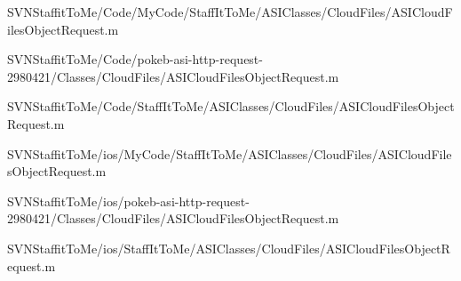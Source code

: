 \begin{DoxyCompactItemize}
\-S\-V\-N\-Staffit\-To\-Me/\-Code/\-My\-Code/\-Staff\-It\-To\-Me/\-A\-S\-I\-Classes/\-Cloud\-Files/\-A\-S\-I\-Cloud\-Files\-Object\-Request.\-m\item 
\-S\-V\-N\-Staffit\-To\-Me/\-Code/pokeb-\/asi-\/http-\/request-\/2980421/\-Classes/\-Cloud\-Files/\-A\-S\-I\-Cloud\-Files\-Object\-Request.\-m\item 
\-S\-V\-N\-Staffit\-To\-Me/\-Code/\-Staff\-It\-To\-Me/\-A\-S\-I\-Classes/\-Cloud\-Files/\-A\-S\-I\-Cloud\-Files\-Object\-Request.\-m\item 
\-S\-V\-N\-Staffit\-To\-Me/ios/\-My\-Code/\-Staff\-It\-To\-Me/\-A\-S\-I\-Classes/\-Cloud\-Files/\-A\-S\-I\-Cloud\-Files\-Object\-Request.\-m\item 
\-S\-V\-N\-Staffit\-To\-Me/ios/pokeb-\/asi-\/http-\/request-\/2980421/\-Classes/\-Cloud\-Files/\-A\-S\-I\-Cloud\-Files\-Object\-Request.\-m\item 
\-S\-V\-N\-Staffit\-To\-Me/ios/\-Staff\-It\-To\-Me/\-A\-S\-I\-Classes/\-Cloud\-Files/\-A\-S\-I\-Cloud\-Files\-Object\-Request.\-m\end{DoxyCompactItemize}

